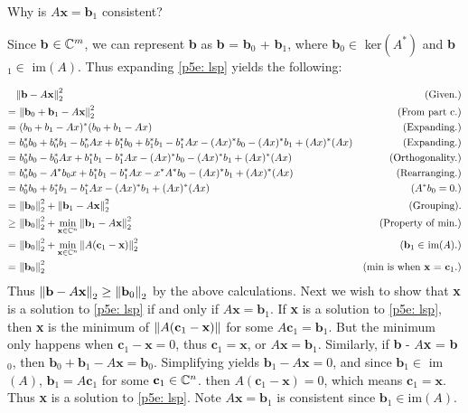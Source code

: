 Why is $A\textbf{x} = \textbf{b}_1$ consistent?
\partbreak
\begin{solution}

    Since \textbf{b} $\in \mathbb{C}^m$, we can represent \textbf{b} as \textbf{b} = \textbf{b}$_0$ + \textbf{b}$_1$, where \textbf{b}$_0 \in$ ker$(A^*)$ and \textbf{b}$_1 \in$ im$(A)$. Thus expanding \ref{p5e: lsp} yields the following:
    
    \alignbreak
{\small
    \begin{align}
        &\norm{\textbf{b} - A\textbf{x}}_2^2 &\text{(Given.)}\nonumber\\
        =& \ \norm{\textbf{b}_0 + \textbf{b}_1 - A\textbf{x}}_2^2 &\text{(From part c.)}\nonumber\\
        =& \ (b_0 + b_1 - Ax)^*(b_0 + b_1 - Ax)   &\text{(Expanding.)}\nonumber\\
        =& \ b_0^*b_0 + b_0^*b_1 - b_0^*Ax + b_1^*b_0 + b_1^*b_1 - b_1^*Ax - (Ax)^*b_0 - (Ax)^*b_1 + (Ax)^*(Ax) &\text{(Expanding.)}\nonumber\\
        =& \ b_0^*b_0 - b_0^*Ax + b_1^*b_1 - b_1^*Ax - (Ax)^*b_0 - (Ax)^*b_1 + (Ax)^*(Ax) &\text{(Orthogonality.)}\nonumber\\
        =& \ b_0^*b_0 - A^*b_0x + b_1^*b_1 - b_1^*Ax - x^*A^*b_0 - (Ax)^*b_1 + (Ax)^*(Ax) &\text{(Rearranging.)}\nonumber\\
        =& \ b_0^*b_0 + b_1^*b_1 - b_1^*Ax - (Ax)^*b_1 + (Ax)^*(Ax) &(A^*b_0 = 0.)\nonumber\\ 
        =& \ \norm{\textbf{b}_0}_2^2 + \norm{\textbf{b}_1 - A\textbf{x}}_2^2  &\text{(Grouping).}\nonumber\\
        \geq& \ \norm{\textbf{b}_0}_2^2 + \min_{\textbf{x}\in \mathbb{C}^n}\norm{\textbf{b}_1 - A\textbf{x}}_2^2 &\text{(Property of min.)}\nonumber\\
        =& \ \norm{\textbf{b}_0}_2^2 + \min_{\textbf{x}\in \mathbb{C}^n}\norm{A(\textbf{c}_1 - \textbf{x})}_2^2  &\text{(\textbf{b}$_1 \in$ im$(A)$.)}\nonumber\\
        =& \ \norm{\textbf{b}_0}_2^2 &\text{(min is when \textbf{x} = \textbf{c}$_1$.)}\nonumber
    \end{align}
}%
    \alignbreak
Thus $\norm{\textbf{b} - A\textbf{x}}_2  \geq \norm{\textbf{b}_0}_2$ by the above calculations. Next we wish to show that \textbf{x} is a solution to \ref{p5e: lsp} if and only if $A\textbf{x} = \textbf{b}_1$. If \textbf{x} is a solution to \ref{p5e: lsp}, then \textbf{x} is the minimum of $\norm{A(\textbf{c}_1 - \textbf{x})}$ for some $A\textbf{c}_1 = \textbf{b}_1$. But the minimum only happens when $\textbf{c}_1 - \textbf{x} = 0$, thus $\textbf{c}_1 = \textbf{x}$, or $A\textbf{x} = \textbf{b}_1$. Similarly, if \textbf{b} - $A$\textbf{x} = \textbf{b}$_0$, then $\textbf{b}_0 + \textbf{b}_1 - A\textbf{x} = \textbf{b}_0$. Simplifying yields $\textbf{b}_1 - A\textbf{x} = 0$, and since $\textbf{b}_1 \in$ im$(A)$, $\textbf{b}_1 = A\textbf{c}_1$ for some $\textbf{c}_1 \in \mathbb{C}^n$. then $A(\textbf{c}_1 - \textbf{x}) = 0$, which means $\textbf{c}_1 = \textbf{x}.$ Thus \textbf{x} is a solution to \ref{p5e: lsp}. Note $A\textbf{x} = \textbf{b}_1$ is consistent since $\textbf{b}_1 \in $im$(A)$.
\end{solution}

